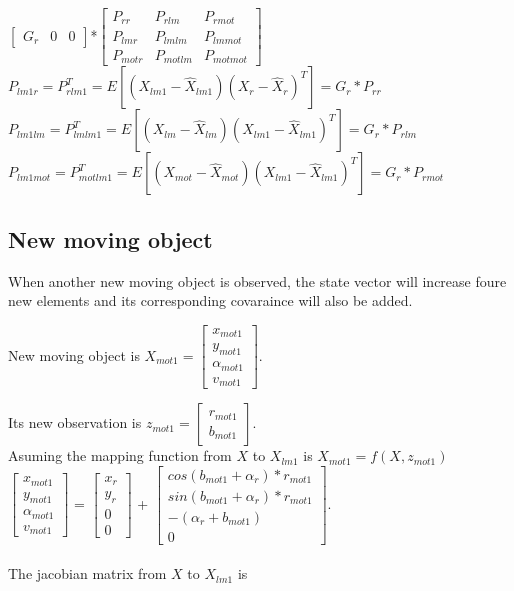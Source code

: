 \documentclass[11pt,a4paper]{article}
\begin{document}
										    $  \begin{bmatrix} G_{r} & 0 & 0 \end{bmatrix}$*$\begin{bmatrix} P_{rr} & P_{rlm} & P_{rmot}\\
										   P_{lmr}& P_{lmlm}  & P_{lmmot}\\
										   P_{motr}& P_{motlm}  & P_{motmot}\end{bmatrix}$\\
\noindent $P_{lm1r} = P_{rlm1}^{T} = E[(X_{lm1}- \hat{X}_{lm1})(X_{r}- \hat{X}_{r})^{T}] = G_{r}*P_{rr}$
\\										   									   
\noindent $P_{lm1lm} = P_{lmlm1}^{T} = E[(X_{lm}- \hat{X}_{lm})(X_{lm1}- \hat{X}_{lm1})^{T}] = G_{r}*P_{rlm}$
\\
\noindent $P_{lm1mot} = P_{motlm1}^{T} = E[(X_{mot}- \hat{X}_{mot})(X_{lm1}- \hat{X}_{lm1})^{T}] = G_{r}*P_{rmot}$

\subsection{New moving object}
When another new moving object is observed, the state vector will increase foure new elements and its corresponding covaraince will also be added.

\noindent New moving object is $ X_{mot1} =  \begin{bmatrix} x_{mot1} \\ y_{mot1} \\ \alpha_{mot1} \\ v_{mot1} \end{bmatrix} $.

\noindent Its new observation is $z_{mot1} = \begin{bmatrix} r_{mot1} \\ b_{mot1} \end{bmatrix}$.
\\
Asuming the mapping function from $X$ to $X_{lm1}$ is $X_{mot1} = f(X,z_{mot1})$
\\
\noindent $\begin{bmatrix} x_{mot1} \\ y_{mot1} \\ \alpha_{mot1} \\ v_{mot1} \end{bmatrix}$ = $\begin{bmatrix} x_{r} \\ y_{r} \\ 0 \\ 0 \end{bmatrix}$  +  $\begin{bmatrix}  cos(b_{mot1}+\alpha_{r})*r_{mot1}\\ sin(b_{mot1}+\alpha_{r})*r_{mot1}  \\ -(\alpha_{r}+b_{mot1}) \\ 0 \end{bmatrix}$.
\\
\\
\noindent The jacobian matrix from $X$ to $X_{lm1}$ is 
\end{document}
